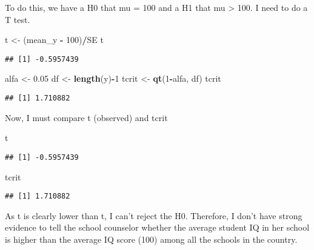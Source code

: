 \documentclass[
]{article}
\newenvironment{Shaded}{\begin{snugshade}}{\end{snugshade}}
\newcommand{\DecValTok}[1]{\textcolor[rgb]{0.00,0.00,0.81}{#1}}
\newcommand{\FloatTok}[1]{\textcolor[rgb]{0.00,0.00,0.81}{#1}}
\newcommand{\FunctionTok}[1]{\textcolor[rgb]{0.13,0.29,0.53}{\textbf{#1}}}
\newcommand{\NormalTok}[1]{#1}
\newcommand{\OtherTok}[1]{\textcolor[rgb]{0.56,0.35,0.01}{#1}}
\newcommand{\SpecialCharTok}[1]{\textcolor[rgb]{0.81,0.36,0.00}{\textbf{#1}}}
\begin{document}
To do this, we have a H0 that mu = 100 and a H1 that mu \textgreater{}
100. I need to do a T test.

\begin{Shaded}
\begin{Highlighting}[]
\NormalTok{t }\OtherTok{\textless{}{-}}\NormalTok{ (mean\_y }\SpecialCharTok{{-}} \DecValTok{100}\NormalTok{)}\SpecialCharTok{/}\NormalTok{SE}
\NormalTok{t}
\end{Highlighting}
\end{Shaded}

\begin{verbatim}
## [1] -0.5957439
\end{verbatim}

\begin{Shaded}
\begin{Highlighting}[]
\NormalTok{alfa }\OtherTok{\textless{}{-}} \FloatTok{0.05}
\NormalTok{df }\OtherTok{\textless{}{-}} \FunctionTok{length}\NormalTok{(y)}\SpecialCharTok{{-}}\DecValTok{1}
\NormalTok{tcrit }\OtherTok{\textless{}{-}} \FunctionTok{qt}\NormalTok{(}\DecValTok{1}\SpecialCharTok{{-}}\NormalTok{alfa, df)}
\NormalTok{tcrit}
\end{Highlighting}
\end{Shaded}

\begin{verbatim}
## [1] 1.710882
\end{verbatim}

Now, I must compare t (observed) and tcrit

\begin{Shaded}
\begin{Highlighting}[]
\NormalTok{t}
\end{Highlighting}
\end{Shaded}

\begin{verbatim}
## [1] -0.5957439
\end{verbatim}

\begin{Shaded}
\begin{Highlighting}[]
\NormalTok{tcrit}
\end{Highlighting}
\end{Shaded}

\begin{verbatim}
## [1] 1.710882
\end{verbatim}

As t is clearly lower than t, I can't reject the H0. Therefore, I don't
have strong evidence to tell the school counselor whether the average
student IQ in her school is higher than the average IQ score (100) among
all the schools in the country.
\end{document}

